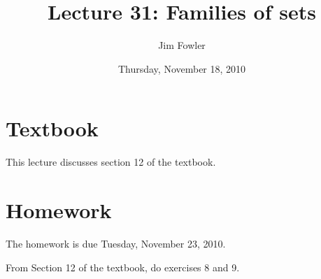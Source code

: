 \documentclass[12pt]{handout}
\title{Lecture 31: Families of sets}
\author{Jim Fowler}
\date{Thursday, November 18, 2010}
\begin{document}
\maketitle

\section*{Textbook}

This lecture discusses section 12 of the textbook.

\section*{Homework} 

The homework is due Tuesday, November 23, 2010.

From Section 12 of the textbook, do exercises 8 and 9.
\end{document}
